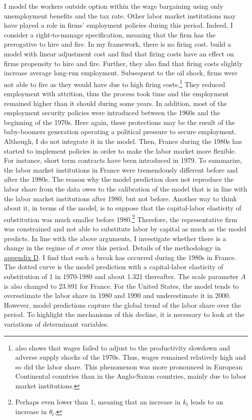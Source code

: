 I model the workers outside option within the wage bargaining using only unemployment benefits and the tax rate. Other labor market institutions may have played a role in firms' employment policies during this period. Indeed, I consider a right-to-manage specification, meaning that the firm has the prerogative to hire and fire. In my framework, there is no firing cost. \cite{Bentolila1990} build a model with linear adjustment cost and find that firing costs have an effect on firms propensity to hire and fire. Further, they also find that firing costs slightly increase average long-run employment. Subsequent to the oil shock, firms were not able to fire as they would have due to high firing costs.\footnote{\cite{Blanchard1997} also shows that wages failed to adjust to the productivity slowdown and adverse supply shocks of the 1970s. Thus, wages remained relatively high and so did the labor share. This phenomenon was more pronounced in European Continental countries than in the Anglo-Saxon countries, mainly due to labor market institutions.} They reduced employment with attrition, thus the process took time and the employment remained higher than it should during some years. In addition, most of the employment security policies were introduced between the 1960s and the beginning of the 1970s. Here again, these protections may be the result of the baby-boomers generation operating a political pressure to secure employment. Although, I do not integrate it in the model. Then, France during the 1980s has started to implement policies in order to make the labor market more flexible. For instance, short term contracts have been introduced in 1979. To summarize, the labor market institutions in France were tremendously different before and after the 1980s. The reason why the model prediction does not reproduce the labor share from the data owes to the calibration of the model that is in line with the labor market institutions after 1980, but not before. Another way to think about it, in terms of the model, is to suppose that the capital-labor elasticity of substitution was much smaller before 1980.\footnote{Perhaps even lower than 1, meaning that an increase in $k_t$ leads to an increase in $\theta_t$.} Therefore, the representative firm was constrained and not able to substitute labor by capital as much as the model predicts.
In line with the above arguments, I investigate whether there is a change in the regime of $\sigma$ over this period. Details of the methodology in \hyperref[appendix:regime]{appendix D}. I find that such a break has occurred during the 1980s in France. The dotted curve is the model prediction with a capital-labor elasticity of substitution of 1 in 1970-1980 and about 1.321 thereafter. The scale parameter $A$ is also changed to 23.891 for France.
For the United States, the model tends to overestimate the labor share in 1980 and 1990 and underestimate it in 2000.
However, model predictions capture the global trend of the labor share over the period.
To highlight the mechanisms of this decline, it is necessary to look at the variations of determinant variables.

